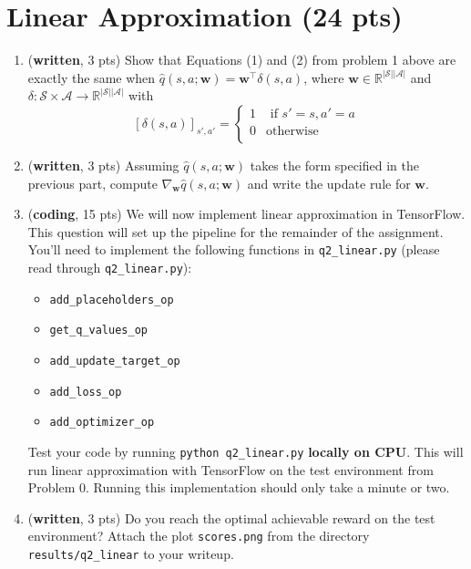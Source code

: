 \documentclass{article}
\begin{document}
\section{Linear Approximation (24 pts)}
\begin{enumerate}
\item (\textbf{written}, 3 pts) Show that Equations (1) and (2) from problem 1 above are exactly the same when  $\hat{q}(s, a; \mathbf{w}) = \mathbf{w}^\top \delta(s,a)$, where $\mathbf{w} \in \mathbb{R}^{\vert\mathcal{S}\vert \vert \mathcal{A}\vert }$ and $\delta : \mathcal{S} \times \mathcal{A} \rightarrow \mathbb{R}^{|\mathcal{S}| |\mathcal{A}|}$ with
\[
    [\delta(s,a)]_{s',a'}=\left\{
                \begin{array}{ll}
                  1 & \text{ if } s'=s, a'=a\\
                  0 & \text{otherwise}\\
                \end{array}
              \right.
  \]

\item (\textbf{written}, 3 pts) Assuming $\hat{q}(s, a; \mathbf{w})$ takes the form specified in the previous part, compute $\nabla_{\mathbf{w}} \hat{q}(s, a; \mathbf{w})$ and write the update rule for $\mathbf{w}$.


 \item (\textbf{coding}, 15 pts) We will now implement linear approximation in TensorFlow. This question will set up the pipeline for the remainder of the assignment. You'll need to implement the following functions in \texttt{q2\_linear.py} (please read through \texttt{q2\_linear.py}):
\begin{itemize}
	\item \texttt{add\_placeholders\_op}
	\item \texttt{get\_q\_values\_op}
	\item \texttt{add\_update\_target\_op}
	\item \texttt{add\_loss\_op}
	\item \texttt{add\_optimizer\_op}
\end{itemize}
Test your code by running \texttt{python q2\_linear.py} \textbf{locally on CPU}.  This will run linear approximation with TensorFlow on the test environment from Problem 0.  Running this implementation should only take a minute or two.

 \item (\textbf{written}, 3 pts) Do you reach the optimal achievable reward on the test environment? Attach the plot \texttt{scores.png} from the directory \texttt{results/q2\_linear} to your writeup.

\end{enumerate}
\end{document}
